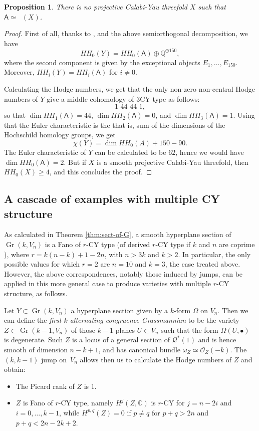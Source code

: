 \documentclass[11pt]{article}
\newcommand{\sbullet}{{\scriptstyle\bullet}}
\newcommand{\HH}{\textit{HH}}
\let\mathcal\mathscr
\theoremstyle{plain}
\newtheorem{prop}[theorem]{Proposition}
\theoremstyle{definition}
\newcommand{\cat}[1]{\mathsf{#1}}
\DeclareMathOperator{\Db}{{\cat{D}^{\mathrm{b}}}}
\DeclareMathOperator{\Gr}{Gr}
\newcommand{\QQ}{\mathbb{Q}}
\newcommand{\CC}{\mathbb{C}}
\newcommand{\sheaf}[1]{\mathcal{#1}}
\newcommand{\ko}{\sheaf{O}}\let\OO\ko\let\cO\ko
\newcommand{\kq}{\sheaf{Q}}
\begin{document}
\begin{prop}
There is no projective Calabi-Yau threefold $X$ such that $\cat{A} \simeq \Db(X)$.
\end{prop}
\begin{proof}
First of all, thanks to \cite{kuz-hochsch}, and the above semiorthogonal decomposition, we have
\[
\HH_0(Y)=\HH_0(\cat{A}) \oplus \QQ^{\oplus 150},
\]
where the second component is given by the exceptional objects $E_1,\ldots,E_{150}$.
Moreover, $\HH_i(Y)=\HH_i(\cat{A})$ for $i \neq 0$.

Calculating the Hodge numbers, we get that the only non-zero non-central Hodge numbers
of $Y$ give a middle cohomology of 3CY type as follows:
\[
1 \,\, 44 \,\, 44 \,\, 1,
\]
so that $\dim \HH_1(\cat{A})=44$, $\dim \HH_2(\cat{A})=0$, and $\dim \HH_3(\cat{A})=1$.
Using that the Euler characteristic is the that is,  sum of the dimensions of the Hochschild homology groups, we get
\[
\chi(Y)=\dim \HH_0(A) + 150 - 90.
\]
The Euler characteristic of $Y$ can be calculated to be $62$,
hence we would have $\dim \HH_0(\cat{A})=2$. But
if $X$ is a smooth projective Calabi-Yau threefold, then $\HH_0(X) \geq 4$, and this concludes the
proof.
\end{proof}

\subsection{A cascade of examples with multiple CY structure}
As calculated in Theorem \ref{thm:sect-of-G}, a smooth hyperplane
section of $\Gr(k,V_n)$ is a Fano of $r$-CY type (of derived $r$-CY type if $k$ and $n$ are
coprime \cite{kuz-fractional}), where $r=k(n-k)+1-2n$, with $n>3k$ and $k>2$. In particular,
the only possible values for which $r=2$ are $n=10$ and $k=3$, the case treated above.
However, the above correspondences, notably those induced by jumps, can be applied in this more
general case to produce varieties with multiple $r$-CY structure, as follows.

Let $Y \subset \Gr(k,V_n)$ a hyperplane section given by a $k$-form $\Omega$ on $V_n$.
Then we can define the {\it first $k$-alternating congruence Grassmannian} to be the variety
$Z \subset \Gr(k-1,V_n)$ of those $k-1$ planes $U \subset V_n$ such that the form
$\Omega(U,\sbullet)$ is degenerate. Such $Z$ is a locus of a general section of
$\kq^*(1)$ and is hence smooth of dimension $n-k+1$, and has canonical bundle
$\omega_Z \simeq \ko_Z(-k)$. The $(k,k-1)$ jump on~$V_n$ allows then us to calculate the
Hodge numbers of $Z$ and obtain:
\begin{itemize}
\item The Picard rank of $Z$ is $1$.
\item $Z$ is Fano of $r$-CY type, namely $H^j(Z,\CC)$ is $r$-CY for $j=n-2i$
and $i=0,\ldots,k-1$, while $H^{p,q}(Z)=0$ if $p\neq q$ for $p+q > 2n$ and
$p+q < 2n-2k+2$.
\end{itemize}
\end{document}
